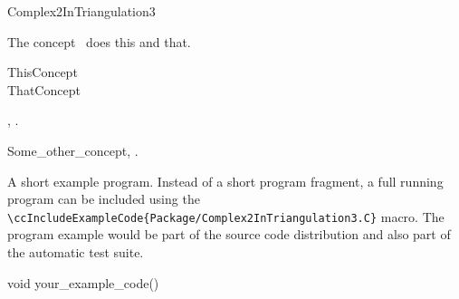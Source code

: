 

\begin{ccRefConcept}{Complex2InTriangulation3}


\ccDefinition
  
The concept \ccRefName\ does this and that.

\ccGeneralizes

ThisConcept \\
ThatConcept

\ccTypes


\ccCreation
{}  %


\ccOperations


\ccHasModels

,
.

\ccSeeAlso

Some\_other\_concept,
.

\ccExample

A short example program.
Instead of a short program fragment, a full running program can be
included using the 
\verb|\ccIncludeExampleCode{Package/Complex2InTriangulation3.C}| 
macro. The program example would be part of the source code distribution and
also part of the automatic test suite.

\begin{ccExampleCode}
void your_example_code() {
}
\end{ccExampleCode}


\end{ccRefConcept}


